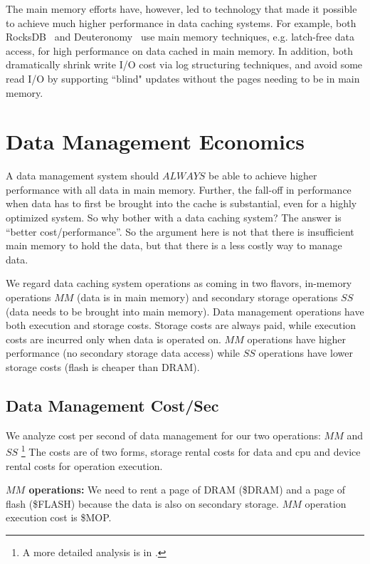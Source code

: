 \documentclass[11pt]{article}
\begin{document}
The main memory efforts have, however, led to technology that made it possible to achieve much higher performance in data caching systems.  For example, both  RocksDB~\cite{rocksdb} and Deuteronomy~\cite{LLS13,LLS13a,TC} use main memory techniques, e.g. latch-free data access, for high performance on data cached in main memory.   In addition, both dramatically shrink write I/O cost via log structuring techniques, and avoid some read I/O by supporting  ``blind" updates without the pages needing to be in main memory.  

\section{Data Management Economics}

\label{sec:analysis}

A data management system should $ALWAYS$ be able to achieve higher performance with all data in main memory.  Further, the fall-off in performance when data has to first be brought into the cache is substantial, even for a highly optimized system. So why bother with a data caching system?  The answer is ``better cost/performance''.  So the argument here is not that there is insufficient main memory to hold the data, but that there is a less costly way to manage data.


We regard data caching system operations as coming in two flavors, in-memory operations $MM$ (data is in main memory) and secondary storage operations $SS$ (data needs to be brought into main memory).  Data management operations have both execution and storage costs.  Storage costs are always paid, while execution costs are incurred only when data is operated on.  $MM$ operations have higher performance (no secondary storage data access) while $SS$ operations have lower storage costs (flash is cheaper than DRAM).  


\subsection{Data Management Cost/Sec}

We analyze cost per second of data management for our two operations: $MM$ and $SS$ \footnote{A more detailed analysis is in \cite{Damon}.}  The costs are of two forms, storage rental costs for data and cpu and device rental costs for operation execution.  

{\bf $MM$ operations:} We need to rent a page of DRAM (\$DRAM) and a page of flash (\$FLASH) because the data is also on secondary storage.  $MM$ operation execution cost is \$MOP.
\end{document}
